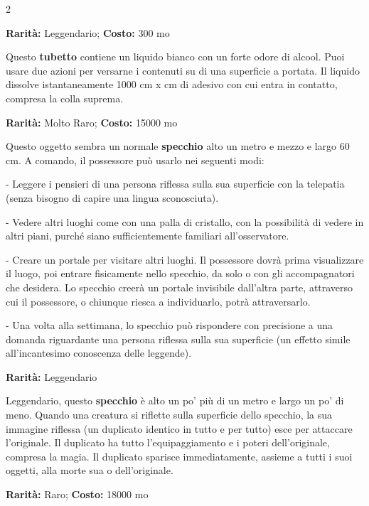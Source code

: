 \begin{multicols}{2}

\textbf{Rarità:} Leggendario; \textbf{Costo:} 300 mo

Questo \textbf{tubetto} contiene un liquido bianco con un forte odore di alcool. Puoi usare due azioni per versarne i contenuti su di una superficie a portata. Il liquido dissolve istantaneamente 1000 cm x cm di adesivo con cui entra in contatto, compresa la colla suprema.


\textbf{Rarità:} Molto Raro; \textbf{Costo:} 15000 mo

Questo oggetto sembra un normale \textbf{specchio} alto un metro e mezzo e largo 60 cm. A comando, il possessore può usarlo nei seguenti modi:

- Leggere i pensieri di una persona riflessa sulla sua superficie con la telepatia (senza bisogno di capire una lingua sconosciuta).

- Vedere altri luoghi come con una palla di cristallo, con la possibilità di vedere in altri piani, purché siano sufficientemente familiari all'osservatore.

- Creare un portale per visitare altri luoghi. Il possessore dovrà prima visualizzare il luogo, poi entrare fisicamente nello specchio, da solo o con gli accompagnatori che desidera. Lo specchio creerà un portale invisibile dall'altra parte, attraverso cui il possessore, o chiunque riesca a individuarlo, potrà attraversarlo.

- Una volta alla settimana, lo specchio può rispondere con precisione a una domanda riguardante una persona riflessa sulla sua superficie (un effetto simile all'incantesimo conoscenza delle leggende).


\textbf{Rarità:} Leggendario

Leggendario, questo \textbf{specchio} è alto un po' più di un metro e largo un po' di meno. Quando una creatura si riflette sulla superficie dello specchio, la sua immagine riflessa (un duplicato identico in tutto e per tutto) esce per attaccare l'originale. Il duplicato ha tutto l'equipaggiamento e i poteri dell'originale, compresa la magia. Il duplicato sparisce immediatamente, assieme a tutti i suoi oggetti, alla morte sua o dell'originale.


\textbf{Rarità:} Raro; \textbf{Costo:} 18000 mo


\end{multicols}
